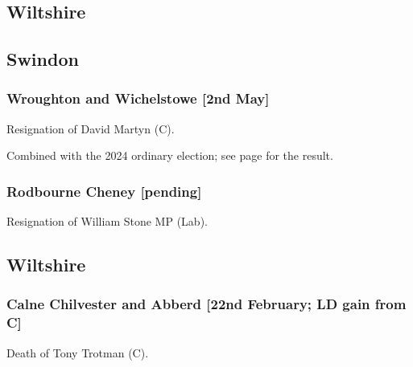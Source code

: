 \documentclass[a4paper,openany]{book}
\begin{document}
\begin{resultsiii}
\section{Wiltshire}

\subsection*{Swindon}

\subsubsection*{Wroughton and Wichelstowe \hspace*{\fill}\nolinebreak[1]%
	\enspace\hspace*{\fill}
	[2nd May]}


Resignation of David Martyn (C).

Combined with the 2024 ordinary election; see page \pageref{WroughtonWichelstoweSwindon} for the result.

\subsubsection*{Rodbourne Cheney \hspace*{\fill}\nolinebreak[1]%
	\enspace\hspace*{\fill}
	[pending]}


Resignation of William Stone MP (Lab).

\subsection*{Wiltshire}

\subsubsection*{Calne Chilvester and Abberd \hspace*{\fill}\nolinebreak[1]%
	\enspace\hspace*{\fill}
	[22nd February; LD gain from C]}


Death of Tony Trotman (C).


\end{resultsiii}
\end{document}
